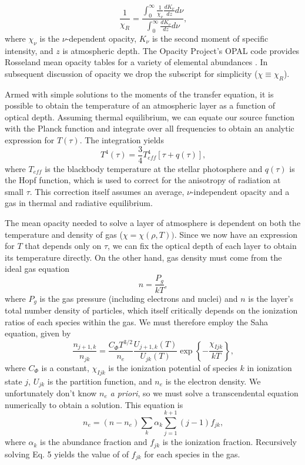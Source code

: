 \documentclass[iop,revtex4]{emulateapj}
\begin{document}
\begin{equation}
\frac{1}{\chi_{R}}=\frac{\int_{0}^{\infty}\frac{1}{\chi_{\nu}}\frac{dK_{\nu}}{dz}d\nu}{\int_{0}^{\infty}\frac{dK_{\nu}}{dz}d\nu}\text{,}
\end{equation}
where $\chi_{\nu}$ is the $\nu$-dependent opacity, $K_{\nu}$ is the second moment of specific intensity, and $z$ is atmospheric depth. The Opacity Project's OPAL code provides Rosseland mean opacity tables for a variety of elemental abundances \citep{opal}. In subsequent discussion of opacity we drop the subscript for simplicity ($\chi\equiv\chi_{R}$).
\par
Armed with simple solutions to the moments of the transfer equation, it is possible to obtain the temperature of an atmospheric layer as a function of optical depth. Assuming thermal equilibrium, we can equate our source function with the Planck function and integrate over all frequencies to obtain an analytic expression for $T(\tau)$. The integration yields
\begin{equation}
T^{4}(\tau)=\frac{3}{4}T_{eff}^{4}[\tau+q(\tau)]\text{,}
\end{equation}
where $T_{eff}$ is the blackbody temperature at the stellar photosphere and $q(\tau)$ is the Hopf function, which is used to correct for the anisotropy of radiation at small $\tau$. This correction itself assumes an average, $\nu$-independent opacity and a gas in thermal and radiative equilibrium.
\par
The mean opacity needed to solve a layer of atmosphere is dependent on both the temperature and density of gas ($\chi=\chi(\rho,T))$. Since we now have an expression for $T$ that depends only on $\tau$, we can fix the optical depth of each layer to obtain its temperature directly. On the other hand, gas density must come from the ideal gas equation
\begin{equation}
n=\frac{P_{g}}{kT}\text{,}
\end{equation}
where $P_{g}$ is the gas pressure (including electrons and nuclei) and $n$ is the layer's total number density of particles, which itself critically depends on the ionization ratios of each species within the gas. We must therefore employ the Saha equation, given by 
\begin{equation}
\frac{n_{j+1,k}}{n_{jk}}=\frac{C_{\Phi}T^{3/2}}{n_{e}}\frac{U_{j+1,k}(T)}{U_{jk}(T)}\exp\left\{-\frac{\chi_{Ijk}}{kT}\right\}\text{,}
\end{equation}
where $C_{\Phi}$ is a constant, $\chi_{Ijk}$ is the ionization potential of species $k$ in ionization state $j$, $U_{jk}$ is the partition function, and $n_{e}$ is the electron density. We unfortunately don't know $n_e$ \textit{a priori}, so we must solve a transcendental equation numerically to obtain a solution. This equation is
\begin{equation}
n_{e}=(n-n_{e})\sum_{k}\alpha_{k}\sum_{j=1}^{k+1}(j-1)f_{jk}\text{,}
\end{equation}
where $\alpha_{k}$ is the abundance fraction and $f_{jk}$ is the ionization fraction. Recursively solving Eq. 5 yields the value of of $f_{jk}$ for each species in the gas.
\end{document}

